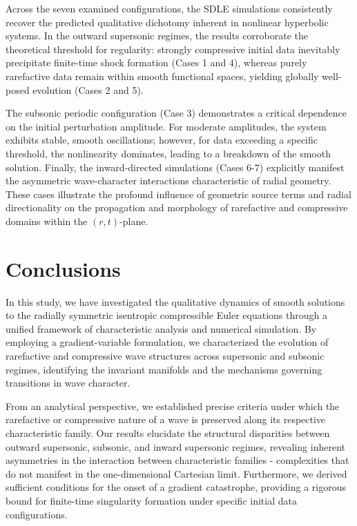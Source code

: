 \documentclass[11pt]{article}
\begin{document}
Across the seven examined configurations, the SDLE simulations consistently recover the predicted qualitative dichotomy inherent in nonlinear hyperbolic systems. In the outward supersonic regimes, the results corroborate the theoretical threshold for regularity: strongly compressive initial data inevitably precipitate finite-time shock formation (Cases 1 and 4), whereas purely rarefactive data remain within smooth functional spaces, yielding globally well-posed evolution (Cases 2 and 5).

The subsonic periodic configuration (Case 3) demonstrates a critical dependence on the initial perturbation amplitude. For moderate amplitudes, the system exhibits stable, smooth oscillations; however, for data exceeding a specific threshold, the nonlinearity dominates, leading to a breakdown of the smooth solution. Finally, the inward-directed simulations (Cases 6-7) explicitly manifest the asymmetric wave-character interactions characteristic of radial geometry. These cases illustrate the profound influence of geometric source terms and radial directionality on the propagation and morphology of rarefactive and compressive domains within the $(r,t)$-plane.


\section{Conclusions}\label{sec:conclusions}

In this study, we have investigated the qualitative dynamics of smooth solutions to the radially symmetric isentropic compressible Euler equations through a unified framework of characteristic analysis and numerical simulation. By employing a gradient-variable formulation, we characterized the evolution of rarefactive and compressive wave structures across supersonic and subsonic regimes, identifying the invariant manifolds and the mechanisms governing transitions in wave character.

From an analytical perspective, we established precise criteria under which the rarefactive or compressive nature of a wave is preserved along its respective characteristic family. Our results elucidate the structural disparities between outward supersonic, subsonic, and inward supersonic regimes, revealing inherent asymmetries in the interaction between characteristic families - complexities that do not manifest in the one-dimensional Cartesian limit. Furthermore, we derived sufficient conditions for the onset of a gradient catastrophe, providing a rigorous bound for finite-time singularity formation under specific initial data configurations.
\end{document}
